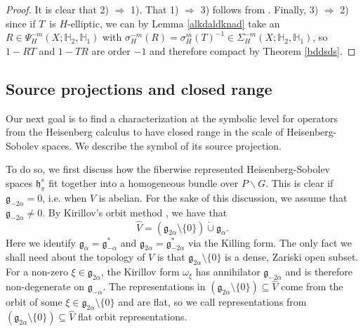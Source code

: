 \documentclass[a4paper,reqno]{amsart}
\numberwithin{equation}{section}
\theoremstyle{definition}
\theoremstyle{remark}
\begin{document}
\begin{proof}
It is clear that 2) $\Rightarrow$ 1). That 1) $\Rightarrow$ 3) follows from \cite{andromoyu}. Finally,  3) $\Rightarrow$ 2) since if $T$ is $H$-elliptic, we can by Lemma \ref{alkdaldknad} take an $R\in \Psi_H^{-m}(X;\mathbb{H}_2,\mathbb{H}_1)$ with $\sigma^{-m}_H(R)=\sigma_H^m(T)^{-1}\in \Sigma_H^{-m}(X;\mathbb{H}_2,\mathbb{H}_1)$, so $1-RT$ and $1-TR$ are order $-1$ and therefore compact by Theorem \ref{bddsds}.
\end{proof}

\subsection{Source projections and closed range}
\label{subsecclosed}
Our next goal is to find a characterization at the symbolic level for operators from the Heisenberg calculus to have closed range in the scale of Heisenberg-Sobolev spaces. We describe the symbol of its source projection. 

To do so, we first discuss how the fiberwise represented Heisenberg-Sobolev spaces $\mathfrak{h}^s_\pi $ fit together into a homogeneous bundle over $P\backslash G$. This is clear if $\mathfrak{g}_{-2\alpha}=0$, i.e. when $V$ is abelian. For the sake of this discussion, we assume that $\mathfrak{g}_{-2\alpha}\neq 0$.  By Kirillov's orbit method \cite{Corwin_Greenleaf,kirillovbook}, we have that 
\begin{equation}
\label{kiridkda}
\hat{V}=(\mathfrak{g}_{2\alpha}\setminus \{0\})\dot{\cup}\mathfrak{g}_{\alpha}.
\end{equation}
Here we identify $\mathfrak{g}_{\alpha}=\mathfrak{g}_{-\alpha}^*$ and $\mathfrak{g}_{2\alpha}=\mathfrak{g}_{-2\alpha}^*$ via the Killing form. The only fact we shall need about the topology of $V$ is that $\mathfrak{g}_{2\alpha}\setminus \{0\}$ is a dense, Zariski open subset. For a non-zero $\xi\in\mathfrak{g}_{2\alpha}$, the Kirillov form $\omega_\xi$ has annihilator $\mathfrak{g}_{-2\alpha}$ and is therefore non-degenerate on $\mathfrak{g}_{-\alpha}$. The representations in $(\mathfrak{g}_{2\alpha}\setminus \{0\})\subseteq \hat{V}$ come from the orbit of some $\xi\in \mathfrak{g}_{2\alpha}\setminus\{0\}$ and are flat, so we call representations from $(\mathfrak{g}_{2\alpha}\setminus \{0\})\subseteq \hat{V}$ flat orbit representations. 
\end{document}
